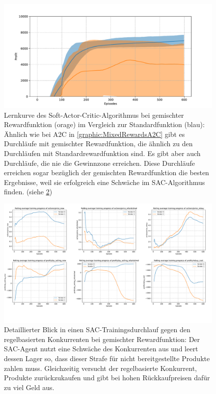 \begin{figure}[htbp]
	\centering
	\includegraphics[width=\textwidth]{appendix/mixed_rewards_sac.pdf}
	\caption{
		Lernkurve des Soft-Actor-Critic-Algorithmus bei gemischter Rewardfunktion (orage) im Vergleich zur Standardfunktion (blau):
		Ähnlich wie bei A2C in \ref{graphic:MixedRewardsA2C} gibt es Durchläufe mit gemischter Rewardfunktion, die ähnlich zu den Durchläufen mit Standardrewardfunktion sind.
		Es gibt aber auch Durchläufe, die nie die Gewinnzone erreichen.
		Diese Durchläufe erreichen sogar bezüglich der gemischten Rewardfunktion die besten Ergebnisse, weil sie erfolgreich eine Schwäche im SAC-Algorithmus finden. (siehe \ref{graphic:ExplanationUnnormalSAC})
	}
	\label{graphic:MixedRewardsSAC}
\end{figure}
\begin{figure}[htbp]
	\centering
	\includegraphics[width=\textwidth]{appendix/explanation_unnormal_sac.pdf}
	\caption{
		Detaillierter Blick in einen SAC-Trainingsdurchlauf gegen den regelbasierten Konkurrenten bei gemischter Rewardfunktion:
		Der SAC-Agent nutzt eine Schwäche des Konkurrenten aus und leert dessen Lager so, dass dieser Strafe für nicht bereitgestellte Produkte zahlen muss.
		Gleichzeitig versucht der regelbasierte Konkurrent, Produkte zurückzukaufen und gibt bei hohen Rückkaufpreisen dafür zu viel Geld aus.
	}
	\label{graphic:ExplanationUnnormalSAC}
\end{figure}
